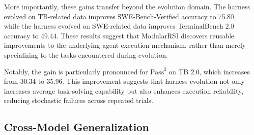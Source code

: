 \documentclass{article} %
\begin{document}
More importantly, these gains transfer beyond the evolution domain. The harness evolved on TB-related data improves SWE-Bench-Verified accuracy to 75.80, while the harness evolved on SWE-related data improves TerminalBench 2.0 accuracy to 49.44. These results suggest that ModularRSI discovers reusable improvements to the underlying agent execution mechanism, rather than merely specializing to the tasks encountered during evolution.

Notably, the gain is particularly pronounced for $\mathrm{Pass}^{3}$ on TB 2.0, which increases from 30.34 to 35.96. This improvement suggests that harness evolution not only increases average task-solving capability but also enhances execution reliability, reducing stochastic failures across repeated trials.


\subsection{Cross-Model Generalization}

\begin{table}
\vspace{-8pt}
\centering
\footnotesize
\setlength{\tabcolsep}{4pt}

\caption{Generalization across different inference models with an evolved harness on TB 2.0.}
\label{tab:model_generalization}


\vspace{-8pt}
\end{table}
\end{document}
